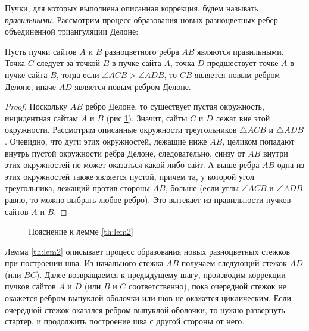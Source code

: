 \documentclass[12pt]{article}
\begin{document}
Пучки, для которых выполнена описанная коррекция, будем называть {\itshape правильными}.
Рассмотрим процесс образования новых разноцветных ребер объединенной триангуляции Делоне:

\begin{lemma}
\label{th:lem2}
Пусть пучки сайтов $A$ и $B$ разноцветного ребра $AB$ являются правильными.
Точка $C$ следует за точкой $B$ в пучке сайта $A$, точка $D$ предшествует точке $A$ в пучке сайта $B$,
тогда если $\angle ACB > \angle ADB$, то $CB$ является новым ребром Делоне, иначе $AD$ является новым ребром Делоне.
\end{lemma}

\begin{proof}
Поскольку $AB$ ребро Делоне, то существует пустая окружность, инцидентная сайтам $A$ и $B$ (рис.\ref{pic:lem2}).
Значит, сайты $C$ и $D$ лежат вне этой окружности.
Рассмотрим описанные окружности треугольников $\triangle ACB$ и $\triangle ADB$.
Очевидно, что дуги этих окружностей, лежащие ниже $AB$, целиком попадают внутрь пустой окружности ребра Делоне, следовательно, снизу от $AB$ внутри этих окружностей не может оказаться какой-либо сайт.
А выше ребра $AB$ одна из этих окружностей также является пустой, причем та, у которой угол треугольника, лежащий против стороны $AB$, больше
(если углы $\angle ACB$ и $\angle ADB$ равно, то можно выбрать любое ребро).
Это вытекает из правильности пучков сайтов $A$ и $B$.
\end{proof}

\begin{figure}[htb!]
	\caption{Пояснение к лемме \ref{th:lem2}}
	\label{pic:lem2}
\end{figure}

Лемма \ref{th:lem2} описывает процесс образования новых разноцветных стежков при построении шва.
Из начального стежка $AB$ получаем следующий стежок $AD$ (или $BC$).
Далее возвращаемся к предыдущему шагу, производим коррекции пучков сайтов $A$ и $D$ (или $B$ и $C$ соответственно),
пока очередной стежок не окажется ребром выпуклой оболочки или шов не окажется циклическим.
Если очередной стежок оказался ребром выпуклой оболочки, то нужно развернуть стартер, и продолжить построение шва с другой стороны от него.
\end{document}
